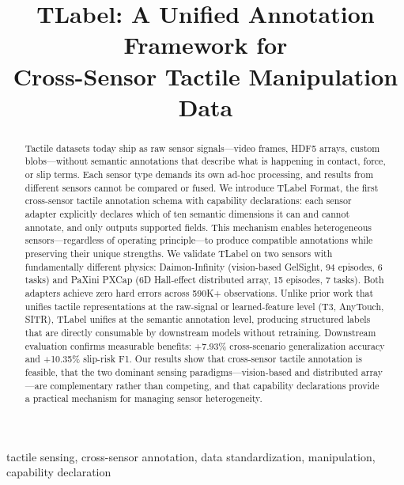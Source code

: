 \documentclass[conference]{IEEEtran}
\begin{document}
\title{TLabel: A Unified Annotation Framework for\\Cross-Sensor Tactile Manipulation Data}

\author{
}

\maketitle

\begin{abstract}
Tactile datasets today ship as raw sensor signals---video frames, HDF5 arrays, custom blobs---without semantic annotations that describe what is happening in contact, force, or slip terms. Each sensor type demands its own ad-hoc processing, and results from different sensors cannot be compared or fused. We introduce TLabel Format, the first cross-sensor tactile annotation schema with capability declarations: each sensor adapter explicitly declares which of ten semantic dimensions it can and cannot annotate, and only outputs supported fields. This mechanism enables heterogeneous sensors---regardless of operating principle---to produce compatible annotations while preserving their unique strengths. We validate TLabel on two sensors with fundamentally different physics: Daimon-Infinity (vision-based GelSight, 94 episodes, 6 tasks) and PaXini PXCap (6D Hall-effect distributed array, 15 episodes, 7 tasks). Both adapters achieve zero hard errors across 590K+ observations. Unlike prior work that unifies tactile representations at the raw-signal or learned-feature level (T3, AnyTouch, SITR), TLabel unifies at the semantic annotation level, producing structured labels that are directly consumable by downstream models without retraining. Downstream evaluation confirms measurable benefits: +7.93\% cross-scenario generalization accuracy and +10.35\% slip-risk F1. Our results show that cross-sensor tactile annotation is feasible, that the two dominant sensing paradigms---vision-based and distributed array---are complementary rather than competing, and that capability declarations provide a practical mechanism for managing sensor heterogeneity.
\end{abstract}

\begin{IEEEkeywords}
tactile sensing, cross-sensor annotation, data standardization, manipulation, capability declaration
\end{IEEEkeywords}
\end{document}
